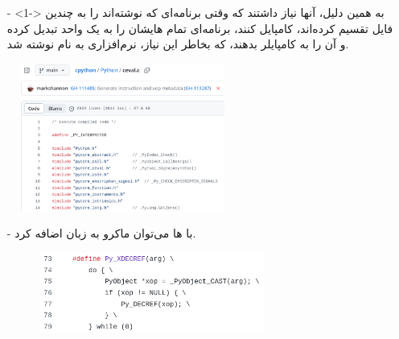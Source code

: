 \begin{frame}{}
\begin{itemize}\itemr
\item[-]<1->
به همین دلیل، آنها نیاز داشتند که وقتی برنامه‌ای که نوشته‌اند را به چندین فایل تقسیم کرده‌اند، کامپایل کنند، برنامه‌ای تمام هایشان را به یک 
واحد تبدیل کرده و آن را به کامپایلر بدهند، که بخاطر این نیاز، نرم‌افزاری به نام 
نوشته شد.
\end{itemize}
\end{frame}

\begin{frame}{}
\begin{figure}[H]
\begin{center}
\includegraphics[width=0.6\textwidth, height=0.7\textheight]{docs/images/include}
\end{center}
\end{figure}
\end{frame}

\begin{frame}{}
\begin{itemize}\itemr
\item[-]
با ها می‌توان ماکرو به زبان اضافه کرد.

\vspace{5mm}
\begin{figure}[H]
\begin{center}
\includegraphics[width=0.7\textwidth, height=0.5\textheight]{docs/images/define}
\end{center}
\end{figure}
\end{itemize}
\end{frame}

